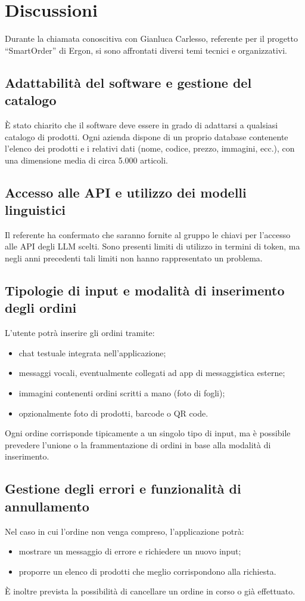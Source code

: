 \documentclass[a4paper,12pt]{article}
\begin{document}
\section{Discussioni}
Durante la chiamata conoscitiva con Gianluca Carlesso, referente per il progetto “SmartOrder” di Ergon, si sono affrontati diversi temi tecnici e organizzativi.

\subsection{Adattabilità del software e gestione del catalogo}
È stato chiarito che il software deve essere in grado di adattarsi a qualsiasi catalogo di prodotti.  
Ogni azienda dispone di un proprio database contenente l’elenco dei prodotti e i relativi dati (nome, codice, prezzo, immagini, ecc.), con una dimensione media di circa 5.000 articoli.

\subsection{Accesso alle API e utilizzo dei modelli linguistici}
Il referente ha confermato che saranno fornite al gruppo le chiavi per l’accesso alle API degli LLM scelti.  
Sono presenti limiti di utilizzo in termini di token, ma negli anni precedenti tali limiti non hanno rappresentato un problema.

\subsection{Tipologie di input e modalità di inserimento degli ordini}
L’utente potrà inserire gli ordini tramite:
\begin{itemize}
    \item chat testuale integrata nell’applicazione;
    \item messaggi vocali, eventualmente collegati ad app di messaggistica esterne;
    \item immagini contenenti ordini scritti a mano (foto di fogli);
    \item opzionalmente foto di prodotti, barcode o QR code.
\end{itemize}
Ogni ordine corrisponde tipicamente a un singolo tipo di input, ma è possibile prevedere l’unione o la frammentazione di ordini in base alla modalità di inserimento.

\subsection{Gestione degli errori e funzionalità di annullamento}
Nel caso in cui l’ordine non venga compreso, l’applicazione potrà:
\begin{itemize}
    \item mostrare un messaggio di errore e richiedere un nuovo input;
    \item proporre un elenco di prodotti che meglio corrispondono alla richiesta.
\end{itemize}
È inoltre prevista la possibilità di cancellare un ordine in corso o già effettuato.
\end{document}

